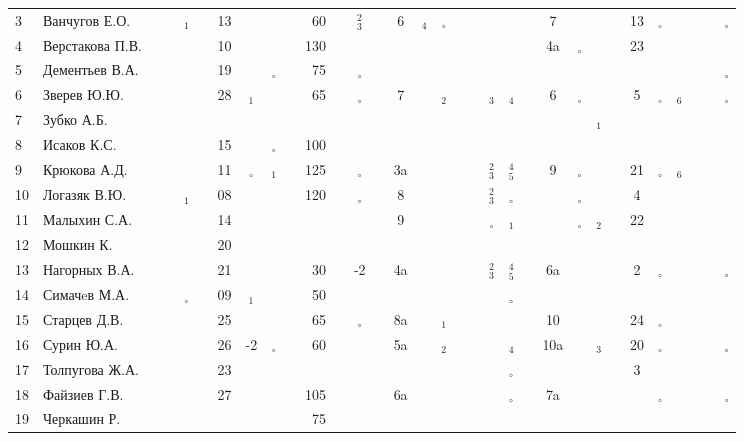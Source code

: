 \documentclass[a4paper,landscape,11pt]{article}
\newcommand*\OK{&\small \ding{51}$\!\!_\circ$} %
\newcommand*\Ok{&\small \ding{51}$\!\!_\circ$} %
\newcommand*\ok{&{\small\ding{51}}} %
\newcommand*\no{&{\small }} %
\newcommand*\da{&{\small\ding{48}$\!\!_1$}} %
\newcommand*\db{&{\small\ding{48}$\!\!_2$}} %
\newcommand*\bc{&{\small\ding{48}$\!\!^2_3$}} %
\newcommand*\dc{&{\small\ding{48}$\!\!_3$}} %
\newcommand*\dd{&{\small\ding{48}$\!\!_4$}} %
\newcommand*\De{&{\small\ding{48}$\!\!^4_5$}} %
\newcommand*\df{&{\small\ding{48}$\!\!_6$}} %
\begin{document}
\begin{tabular}{l|l|ccccccccrccccccccccccccccccccc}
 3& Ванчугов Е.О.    \ok\ok\da\ok&13\no\no\ok& 60\ok\bc\ok&  6\dd\Ok\ok\ok\ok\ok\ok&  7\ok\ok\ok&13\Ok\ok\ok\ok\Ok\\ %
 4& Верстакова П.В.  \ok\ok\ok\ok&10\no\no\no&130\no\no\no \no\no\no\ok\ok\no\no\no& 4a\Ok\no\no&23\no\no\no\no\no\\
 5& Дементьев В.А.   \ok\ok\ok\ok&19\no\OK\ok& 75\no\Ok\ok \no\ok\no\no\ok\ok\no\no \no\ok\ok\ok\ok\no\ok\ok\ok\Ok\\
 6& Зверев Ю.Ю.      \ok\ok\ok\ok&28\da\ok\ok& 65\ok\Ok\ok&  7\no\db\ok\ok\dc\dd\ok&  6\Ok\ok\ok& 5\Ok\df\ok\ok\Ok\\
 7& Зубко А.Б.       \ok\no\ok\ok\no\no\ok\ok \no\no\no\no \no\no\no\no\no\no\no\no \no\no\da\ok\no\no\no\no\no\no\\ 
 8& Исаков К.С.      \ok\ok\ok\ok&15\no\OK\ok&100\no\ok\ok \no\no\no\no\ok\no\no\no \no\no\no\no\no\no\no\no\no\no\\
 9& Крюкова А.Д.     \ok\ok\ok\ok&11\OK\da\ok&125\ok\Ok\ok& 3a\ok\ok\ok\ok\bc\De\ok&  9\Ok\no\no&21\Ok\df\ok\ok\ok\\
10& Логазяк В.Ю.     \ok\ok\da\ok&08\no\ok\ok&120\ok\Ok\ok&  8\ok\ok\ok\ok\bc\Ok\ok \no\Ok\ok\ok& 4\no\ok\ok\no\no\\
\midrule
11& Малыхин С.А.     \ok\no\ok\ok&14\no\no\no \no\no\ok\ok&  9\no\no\no\ok\Ok\da\ok \no\Ok\db\ok&22\no\ok\ok\ok\ok\\
12& Мошкин К.        \ok\ok\ok\ok&20\ok\no\no \no\no\no\ok \no\no\no\no\no\no\no\no \no\no\no\no\no\no\no\no\no\no\\
13& Нагорных В.А.    \ok\ok\ok\ok&21\ok\ok\ok& 30\ok&-2\ok& 4a\ok\ok\ok\ok\bc\De\ok& 6a\no\ok\ok& 2\Ok\no\no\no\Ok\\
14& Симачeв М.А.     \ok\ok\OK\ok&09\da\no\no& 50\no\no\no \no\no\ok\ok\ok\no\Ok\ok \no\no\no\no\no\no\no\no\no\no\\
15& Старцев Д.В.     \ok\ok\ok\ok&25\ok\ok\ok& 65\ok\Ok\ok& 8a\ok\da\ok\ok\ok\ok\ok& 10\ok\ok\ok&24\Ok\ok\ok\ok\ok\\
16& Сурин Ю.А.       \ok\ok\ok\ok&26&-2\OK\ok& 60\ok\ok\ok& 5a\ok\db\ok\ok\no\dd\ok&10a\ok\dc\ok&20\Ok\ok\ok\ok\Ok\\
17& Толпугова Ж.А.   \no\no\no\no&23\ok\no\no \no\no\no\no \no\no\ok\ok\no\ok\Ok\ok \no\no\no\no& 3\no\no\no\no\no\\
18& Файзиев Г.В.     \ok\ok\ok\ok&27\ok\ok\ok&105\ok\ok\ok& 6a\ok\no\ok\ok\ok\Ok\ok& 7a\ok\ok\ok\ok\Ok\ok\ok\ok\OK\\
19& Черкашин Р.      \ok\ok\ok\ok\no\no\no\no& 75\no\ok\ok \no\no\no\no\no\no\no\no \no\no\no\no\no\no\no\no\ok\no\\ 
\bottomrule
\end{tabular} 
\end{document}
